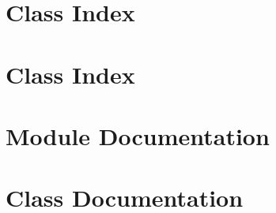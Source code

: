 \documentclass[a4paper]{book}
\begin{document}
\chapter{Class Index}

\chapter{Class Index}

\chapter{Module Documentation}




\chapter{Class Documentation}


































\printindex
\end{document}

